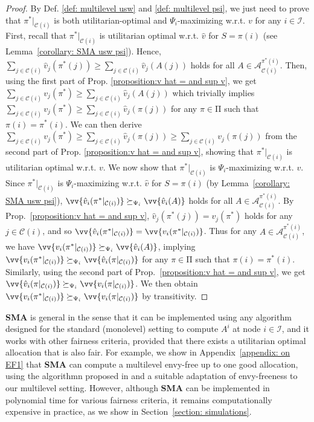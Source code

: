 \documentclass[]{article}
\newcommand{\children}{\mathcal{C}}
\newcommand{\internal}{\mathcal{I}}
\newcommand{\mallocations}{\mathrm{\Pi}}
\newcommand{\allocations}{\mathcal{A}}
\begin{document}
\begin{proof}
 By Def. \ref{def: multilevel usw} and \ref{def: multilevel psi}, we just need to prove that $\pi^* \vert_{\children(i)}$ is both utilitarian-optimal and $\Psi_i$-maximizing w.r.t. $v$ for any $i \in \internal$. First, recall that $\pi^* \vert_{\children(i)}$ is utilitarian optimal w.r.t. $\hat{v}$ for $S = \pi(i)$ (see Lemma~\ref{corollary: SMA usw psi}). Hence, $\sum_{j \in \children(i)} \hat{v}_j(\pi^*(j)) \geq \sum_{j \in \children(i)} \hat{v}_j(A(j))$ holds for all $A \in \allocations^{\pi^*(i)}_{\children(i)}$. Then, using the first part of Prop. \ref{proposition:v hat  = and sup v}, we get $\sum_{j \in \children(i)} v_j(\pi^*) \geq \sum_{j \in \children(i)} \hat{v}_j(A(j))$ which trivially implies $\sum_{j \in \children(i)} v_j(\pi^*) \geq  \sum_{j \in \children(i)} \hat{v}_j(\pi(j))$ for any $\pi \in  \mallocations$ such that $\pi(i) = \pi^*(i)$. 
 We can then derive $\sum_{j \in \children(i)} v_j(\pi^*) \geq \sum_{j \in \children(i)} \hat{v}_j(\pi(j)) \ge \sum_{j \in \children(i)} {v}_j(\pi(j))$ from the second part of Prop. \ref{proposition:v hat  = and sup v}, showing that $\pi^* \vert_{\children(i)}$ is utilitarian optimal w.r.t. $v$. 
 We now show that $\pi^* \vert_{\children(i)}$ is $\Psi_i$-maximizing w.r.t. $v$. Since $\pi^* \vert_{\children(i)}$ is $\Psi_i$-maximizing w.r.t. $\hat{v}$ for $S = \pi(i)$ (by Lemma~\ref{corollary: SMA usw psi}), $\vv{\hat{v}_i(\pi^*\vert_{\children(i)})} \succeq_{\Psi_i} \vv{\hat{v}_i(A)}$ holds for all $A \in \allocations^{\pi^*(i)}_{\children(i)}$. By Prop.~\ref{proposition:v hat  = and sup v}, $\hat{v}_j(\pi^*(j)) =  v_j(\pi^*)$ holds for any $j \in \children(i)$, and so $\vv{\hat{v}_i(\pi^*\vert_{\children(i)})}  = \vv{v_i(\pi^*\vert_{\children(i)})}$. Thus for any $A \in \allocations^{\pi^*(i)}_{\children(i)}$, we have $\vv{v_i(\pi^*\vert_{\children(i)})} \succeq_{\Psi_i} \vv{\hat{v}_i(A)}$, implying $\vv{v_i(\pi^*\vert_{\children(i)})} \succeq_{\Psi_i} \vv{\hat{v}_i(\pi\vert_{\children(i)})}$ for any $\pi \in \mallocations$ such that $\pi(i) = \pi^*(i)$. %
Similarly, using the second part of Prop.~\ref{proposition:v hat  = and sup v}, we get $\vv{\hat{v}_i(\pi\vert_{\children(i)})} \succeq_{\Psi_i} \vv{{v}_i(\pi\vert_{\children(i)})}$. We then obtain $\vv{v_i(\pi^*\vert_{\children(i)})} \succeq_{\Psi_i} \vv{{v}_i(\pi\vert_{\children(i)})}$ by transitivity. 
\end{proof}

{\bf SMA} is general in the sense that it can be implemented using any algorithm designed for the standard (monolevel) setting to compute $A^i$ at node $i  \in \internal$, and it works with other fairness criteria, provided that there exists a utilitarian optimal allocation that is also fair. For example, we show in Appendix~\ref{appendix: on EF1} that \textbf{SMA} can compute a multilevel envy-free up to one good allocation, using the algorithmn proposed in \cite{Benabbou_et_al2021} and a suitable adaptation of envy-freeness to our multilevel setting. However, although \textbf{SMA} can be implemented in polynomial time for various fairness criteria, it remains computationally expensive in practice, as we show in Section~\ref{section: simulations}. 
\end{document}
